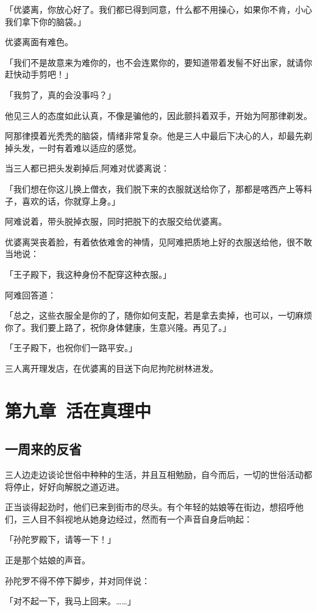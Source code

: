 \documentclass[twoside,openany]{book}
\begin{document}
「优婆离，你放心好了。我们都已得到同意，什么都不用操心，如果你不肯，小心我们拿下你的脑袋。」

优婆离面有难色。

「我们不是故意来为难你的，也不会连累你的，要知道带着发髻不好出家，就请你赶快动手剪吧！」

「我剪了，真的会没事吗？」

他见三人的态度如此认真，不像是骗他的，因此颤抖着双手，开始为阿那律剃发。

阿那律摸着光秃秃的脑袋，情绪非常复杂。他是三人中最后下决心的人，却最先剃掉头发，一时有着难以适应的感觉。

当三人都已把头发剃掉后,阿难对优婆离说：

「我们想在你这儿换上僧衣，我们脱下来的衣服就送给你了，那都是喀西产上等料子，喜欢的话，你就穿上身。」

阿难说着，带头脱掉衣服，同时把脱下的衣服交给优婆离。

优婆离哭丧着脸，有着依依难舍的神情，见阿难把质地上好的衣服送给他，很不敢当地说：

「王子殿下，我这种身份不配穿这种衣服。」

阿难回答道：

「总之，这些衣服全是你的了，随你如何支配，若是拿去卖掉，也可以，一切麻烦你了。我们要上路了，祝你身体健康，生意兴隆。再见了。」

「王子殿下，也祝你们一路平安。」

三人离开理发店，在优婆离的目送下向尼拘陀树林进发。



\chapter{第九章\ 活在真理中}\label{ch9}

\section{一周来的反省}\label{sec9.1}

三人边走边谈论世俗中种种的生活，并且互相勉励，自今而后，一切的世俗活动都将停止，好好向解脱之道迈进。

正当谈得起劲时，他们已来到街市的尽头。有个年轻的姑娘等在街边，想招呼他们，三人目不斜视地从她身边经过，然而有一个声音自身后响起：

「孙陀罗殿下，请等一下！」

正是那个姑娘的声音。

孙陀罗不得不停下脚步，并对同伴说：

「对不起一下，我马上回来。……」
\end{document}
